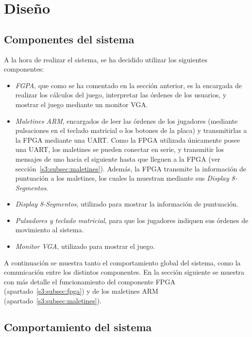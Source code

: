 \section{Diseño}
\label{s2:sec:Disenyo}

\subsection{Componentes del sistema}
\label{s2:subsec:sistema-entero}
A la hora de realizar el sistema, se ha decidido utilizar los siguientes
componentes:
\begin{itemize}
\item \emph{FGPA}, que como se ha comentado en la sección anterior, es la
  encargada de realizar los cálculos del juego, interpretar las órdenes de
  los usuarios, y mostrar el juego mediante un monitor VGA.
\item \emph{Maletines ARM}, encargados de leer las órdenes de los
  jugadores (mediante pulsaciones en el teclado matricial o los botones de
  la placa) y transmitirlas a la FPGA mediante una UART. Como la FPGA
  utilizada únicamente posee una UART, los maletines se pueden conectar en
  serie, y transmitir los mensajes de uno hacia el siguiente hasta que
  lleguen a la FPGA (ver sección~\ref{s3:subsec:maletines}). Además, la
  FPGA transmite la información de puntuación a los maletines, los cuales
  la muestran mediante sus \emph{Display 8-Segmentos}.
\item \emph{Display 8-Segmentos}, utilizado para mostrar la información de
  puntuación.
\item \emph{Pulsadores y teclado matricial}, para que los jugadores
  indiquen sus órdenes de movimiento al sistema.
\item \emph{Monitor VGA}, utilizado para mostrar el juego.
\end{itemize}

A continuación se muestra tanto el comportamiento global del sistema, como
la comunicación entre los distintos componentes. En la sección siguiente
se muestra con más detalle el funcionamiento del componente FPGA
(apartado~\ref{s3:subsec:fpga}) y de los maletines ARM
(apartado~\ref{s3:subsec:maletines}).

\subsection{Comportamiento del sistema}
\label{s2:subsec:comportamiento}
\\

